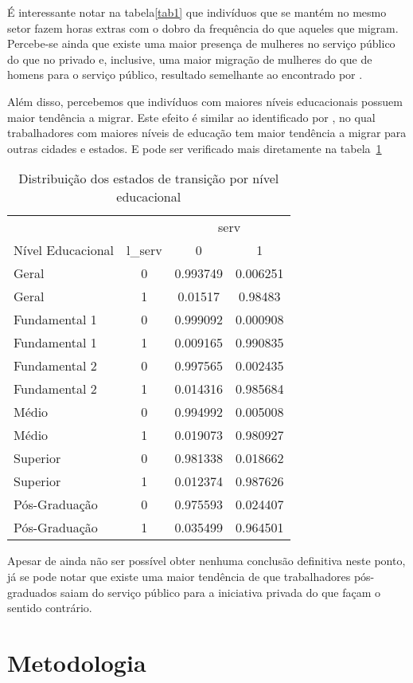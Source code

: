 \documentclass[a4paper]{article}
\begin{document}
É interessante notar na tabela\ref{tab1} que indivíduos que se mantém no mesmo setor fazem horas extras com o dobro da frequência do que aqueles que migram. Percebe-se ainda que existe uma maior presença de mulheres no serviço público do que no privado e, inclusive, uma maior migração de mulheres do que de homens para o serviço público, resultado semelhante ao encontrado por \citet{blank1985}.

Além disso, percebemos que indivíduos com maiores níveis educacionais possuem maior tendência a migrar. Este efeito é similar ao identificado por \citet{mendes2017}, no qual trabalhadores com maiores níveis de educação tem maior tendência a migrar para outras cidades e estados. E pode ser verificado mais diretamente na tabela~\ref{tab2}


\begin{table}[H]
\centering
\caption{Distribuição dos estados de transição por nível educacional}
\label{tab2}
\begin{tabular}{lccc}
 &  & \multicolumn{2}{c}{serv} \\
Nível Educacional & l\_serv & 0 & 1 \\ \hline
Geral & 0 & 0.993749 & 0.006251 \\
Geral & 1 & 0.01517 & 0.98483 \\ \hline
Fundamental 1 & 0 & 0.999092 & 0.000908 \\
Fundamental 1 & 1 & 0.009165 & 0.990835 \\ \hline
Fundamental 2 & 0 & 0.997565 & 0.002435 \\
Fundamental 2 & 1 & 0.014316 & 0.985684 \\ \hline
Médio & 0 & 0.994992 & 0.005008 \\
Médio & 1 & 0.019073 & 0.980927 \\ \hline
Superior & 0 & 0.981338 & 0.018662 \\
Superior & 1 & 0.012374 & 0.987626 \\ \hline
Pós-Graduação & 0 & 0.975593 & 0.024407 \\
Pós-Graduação & 1 & 0.035499 & 0.964501
\end{tabular}
\end{table}

Apesar de ainda não ser possível obter nenhuma conclusão definitiva neste ponto, já se pode notar que existe uma maior tendência de que trabalhadores pós-graduados saiam do serviço público para a iniciativa privada do que façam o sentido contrário.

\section{Metodologia}
\end{document}
